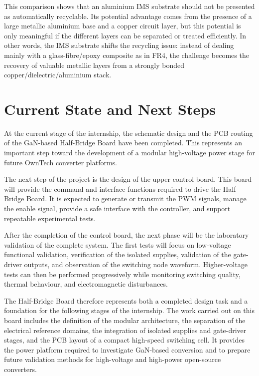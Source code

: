This comparison shows that an aluminium IMS substrate should not be presented as automatically recyclable. Its potential advantage comes from the presence of a large metallic aluminium base and a copper circuit layer, but this potential is only meaningful if the different layers can be separated or treated efficiently. In other words, the IMS substrate shifts the recycling issue: instead of dealing mainly with a glass-fibre/epoxy composite as in FR4, the challenge becomes the recovery of valuable metallic layers from a strongly bonded copper/dielectric/aluminium stack.

\newpage    
\section{Current State and Next Steps}

At the current stage of the internship, the schematic design and the PCB routing of the GaN-based Half-Bridge Board have been completed. This represents an important step toward the development of a modular high-voltage power stage for future OwnTech converter platforms.

The next step of the project is the design of the upper control board. This board will provide the command and interface functions required to drive the Half-Bridge Board. It is expected to generate or transmit the PWM signals, manage the enable signal, provide a safe interface with the controller, and support repeatable experimental tests.

After the completion of the control board, the next phase will be the laboratory validation of the complete system. The first tests will focus on low-voltage functional validation, verification of the isolated supplies, validation of the gate-driver outputs, and observation of the switching node waveform. Higher-voltage tests can then be performed progressively while monitoring switching quality, thermal behaviour, and electromagnetic disturbances.

The Half-Bridge Board therefore represents both a completed design task and a foundation for the following stages of the internship. The work carried out on this board includes the definition of the modular architecture, the separation of the electrical reference domains, the integration of isolated supplies and gate-driver stages, and the PCB layout of a compact high-speed switching cell. It provides the power platform required to investigate GaN-based conversion and to prepare future validation methods for high-voltage and high-power open-source converters.
